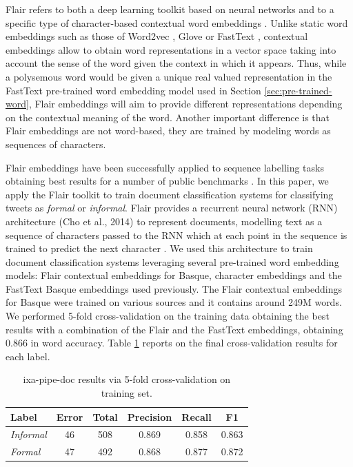 \documentclass[information,article,submit,moreauthors,pdftex,10pt,a4paper]{Definitions/mdpi}
\begin{document}
Flair refers to both a deep learning toolkit based on neural networks and to a specific type of character-based contextual word embeddings \cite{akbik2018contextual}. Unlike static word embeddings such as those of Word2vec \cite{mikolov2013distributed}, Glove \cite{pennington-etal-2014-glove} or FastText \cite{mikolov-etal-2018-advances}, contextual embeddings allow to obtain word representations in a vector space taking into account the sense of the word given the context in which it appears. Thus, while a polysemous word would be given a unique real valued representation in the FastText pre-trained word embedding model used in Section \ref{sec:pre-trained-word}, Flair embeddings will aim to provide different representations depending on the contextual meaning of the word. Another important difference is that Flair embeddings are not word-based, they are trained by modeling words as sequences of characters.

Flair embeddings have been successfully applied to sequence labelling tasks obtaining best results for a number of public benchmarks \cite{akbik2018contextual}. In this paper, we apply the Flair toolkit to train document classification systems for classifying tweets as \emph{formal} or \emph{informal}. Flair provides a recurrent neural network (RNN) architecture (Cho et al., 2014) to represent documents, modelling text as a sequence of characters passed to the RNN which at each point in the sequence is trained to predict the next character \cite{akbik2018contextual}. We used this architecture to train document classification systems leveraging several pre-trained word embedding models: Flair contextual embeddings for Basque, character embeddings and the FastText Basque embeddings used previously. The Flair contextual embeddings for Basque were trained on various sources and it contains around 249M words. We performed 5-fold cross-validation on the training data obtaining the best results with a combination of the Flair and the FastText embeddings, obtaining 0.866 in word accuracy. Table \ref{tab:flair} reports on the final cross-validation results for each label.

\begin{table}[H]
  \centering
  \begin{tabular}{|l|c|c|c|c|c|}
    \hline
    \textbf{Label} & \textbf{Error} & \textbf{Total} & \textbf{Precision} & \textbf{Recall} & \textbf{F1}\\ \hline
    \textit{Informal} & 46 & 508 & 0.869  & 0.858  & 0.863\\ \hline
    \textit{Formal} &  47 & 492 & 0.868 & 0.877 & 0.872\\ \hline
  \end{tabular}
  \caption{ixa-pipe-doc results via 5-fold cross-validation on training set.}
  \label{tab:flair}
\end{table}
\end{document}
